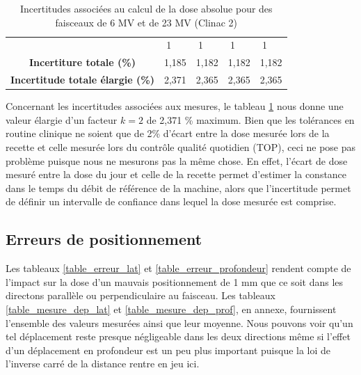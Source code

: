 \documentclass{article}
\begin{document}
\begin{table}[h]
\begin{tabular}{c|cccc|cccc|}
     &
    \multicolumn{1}{c|}{1} &
     &
    1 &
     &
    \multicolumn{1}{c|}{1} &
     &
    1 \\
  \multicolumn{1}{|c|}{\textbf{Incertiture totale (\%)}} &
    \multicolumn{2}{c|}{1,185} &
    \multicolumn{2}{c|}{1,182} &
    \multicolumn{2}{c|}{1,182} &
    \multicolumn{2}{c|}{1,182} \\ \hline
  \multicolumn{1}{|c|}{\textbf{Incertitude totale élargie (\%)}} &
    \multicolumn{2}{c|}{2,371} &
    \multicolumn{2}{c|}{2,365} &
    \multicolumn{2}{c|}{2,365} &
    \multicolumn{2}{c|}{2,365} \\ \hline
  \end{tabular}
  \caption{Incertitudes associées au calcul de la dose absolue pour des faisceaux de 6 MV et de 23 MV (Clinac 2)}
  \label{table_incertitudes_abs}
\end{table}

Concernant les incertitudes associées aux mesures, le tableau \ref*{table_incertitudes_abs} nous donne une valeur élargie d'un facteur $k=2$ de 2,371 \% maximum. Bien que les tolérances en routine clinique ne soient que de 2\% d'écart entre la dose mesurée lors de la recette et celle mesurée lors du contrôle qualité quotidien (TOP), ceci ne pose pas problème puisque nous ne mesurons pas la même chose. En effet, l'écart de dose mesuré entre la dose du jour et celle de la recette permet d'estimer la constance dans le temps du débit de référence de la machine, alors que l'incertitude permet de définir un intervalle de confiance dans lequel la dose mesurée est comprise.

\subsection{Erreurs de positionnement}

Les tableaux \ref*{table_erreur_lat} et \ref*{table_erreur_profondeur} rendent compte de l'impact sur la dose d'un mauvais positionnement de 1 mm que ce soit dans les directons parallèle ou perpendiculaire au faisceau. Les tableaux \ref*{table_mesure_dep_lat} et \ref*{table_mesure_dep_prof}, en annexe, fournissent l'ensemble des valeurs mesurées ainsi que leur moyenne. Nous pouvons voir qu'un tel déplacement reste presque négligeable dans les deux directions même si l'effet d'un déplacement en profondeur est un peu plus important puisque la loi de l'inverse carré de la distance rentre en jeu ici.  
\end{document}
